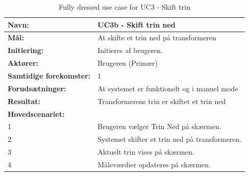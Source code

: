 \begin{table}[H]
	\centering
	
	\begin{threeparttable}
		\begin{tabularx}{\linewidth}{ l X }
			\toprule
			\bfseries{Navn:}				& UC3b - Skift trin ned  \\
			\midrule
			\bfseries{Mål:} 				& At skifte et trin ned på transformeren \\
			\midrule
			\bfseries{Initiering:} 			& Initieres af brugeren. \\
			\midrule
			\bfseries{Aktører:} 			& Brugeren (Primær) \\
			\midrule
			\bfseries{Samtidige forekomster:} & 1 \\
			\midrule
			\bfseries{Forudsætninger:} 		& At systemet er funktionelt og i manuel mode\\
			\midrule
			\bfseries{Resultat:} 			& Transformerens trin er skiftet et trin ned \\
			\midrule
			\bfseries{Hovedscenariet:} 	& \\
			
			
			1 	& Brugeren vælger Trin Ned på skærmen.\\
			2 	& Systemet skifter et trin ned på transformeren.\\
			3 	& Aktuelt trin vises på skærmen.\\
			4 	& Måleværdier opdateres på skærmen.\\			
			
			\bottomrule
			
		\end{tabularx}
	\end{threeparttable}
	\caption{Fully dressed use case for UC3 - Skift trin}
	\label{table:UC3}
\end{table}


